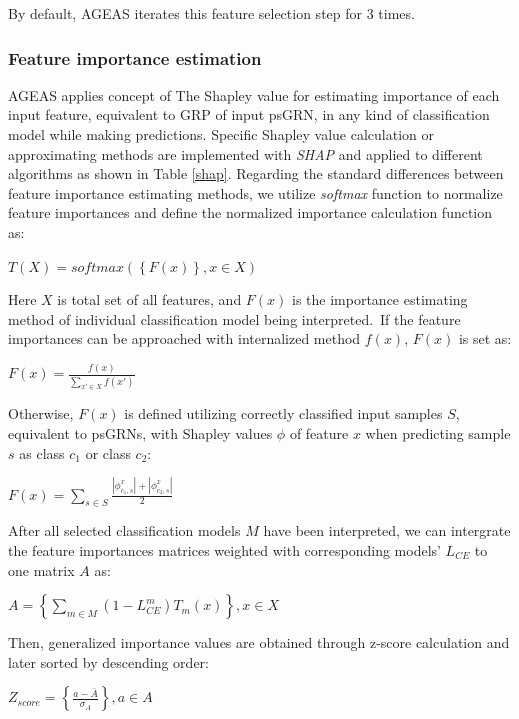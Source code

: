 \documentclass[fleqn,10pt]{wlscirep}
\begin{document}
    By default, AGEAS iterates this feature selection step for 3 times.

    \subsubsection*{Feature importance estimation}
      \label{features_importances}
      AGEAS applies concept of The Shapley value\cite{roth_1988} for estimating importance of each input feature, equivalent to GRP of input psGRN, in any kind of classification model while making predictions.
      Specific Shapley value calculation or approximating methods are implemented with \emph{SHAP}\cite{lundberg2017unified} and applied to different algorithms as shown in Table \ref{shap}.
      Regarding the standard differences between feature importance estimating methods, we utilize \emph{softmax} function to normalize feature importances and define the normalized importance calculation function as:

      \centerline{$T(X) = softmax(\left\{ F(x) \right\}, x \in X)$}

      \noindent Here $X$ is total set of all features, and $F(x)$ is the importance estimating method of individual classification model being interpreted.\
      If the feature importances can be approached with internalized method $f(x)$, $F(x)$ is set as:

      \centerline{$F(x) = \frac{f(x)}{\sum_{x' \in X} f(x')}$}

      \noindent Otherwise, $F(x)$ is defined utilizing correctly classified input samples $S$, equivalent to psGRNs, with Shapley values $\phi$ of feature $x$ when predicting sample $s$ as class $c_1$ or class $c_2$:\

      \centerline{$F(x) = \sum_{s \in S}\frac{\left|\phi_{c_1,s}^{x}\right| + \left|\phi_{c_2,s}^{x}\right|}{2}$}

      \noindent After all selected classification models $M$ have been interpreted, we can intergrate the feature importances matrices weighted with corresponding models' $L_{CE}$ to one matrix $A$ as:\

      \centerline{
        $ A = \left\{ \sum_{m \in M}(1 - L_{CE}^{m})T_{m}(x) \right\}, x \in X $
      }

      \noindent Then, generalized importance values are obtained through z-score calculation and later sorted by descending order:\

      \centerline{
        $Z_{score} = \left\{\frac{a - \bar{A}}{\sigma_A}\right\}, a \in A$
      }
\end{document}
